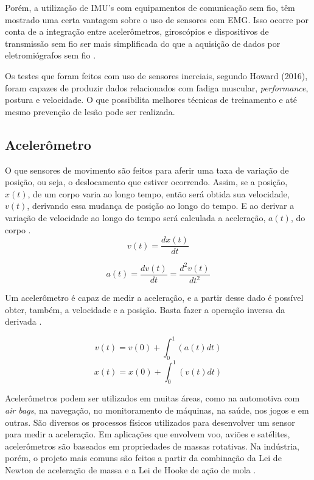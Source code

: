 		Porém, a utilização de IMU's com equipamentos de comunicação sem fio, têm mostrado uma certa vantagem sobre o uso de sensores com EMG. Isso ocorre por conta de a integração entre acelerômetros, giroscópios e dispositivos de transmissão sem fio ser mais simplificada do que a aquisição de dados por eletromiógrafos sem fio \cite{howard2016}. 
		
		Os testes que foram feitos com uso de sensores inerciais, segundo  Howard (2016), foram capazes de produzir dados relacionados com fadiga muscular, \textit{performance}, postura e velocidade. O que possibilita melhores técnicas de treinamento e até mesmo prevenção de lesão pode ser realizada.

			\subsection{Acelerômetro}
			
				O que sensores de movimento são feitos para aferir uma taxa de variação de posição, ou seja, o deslocamento que estiver ocorrendo. Assim, se a posição, $x(t)$, de um corpo varia ao longo tempo, então será obtida sua velocidade, $v(t)$,  derivando essa mudança de posição ao longo do tempo. E ao derivar a variação de velocidade ao longo do tempo será calculada a aceleração, $a(t)$, do corpo \cite{moyses2013}.
				\begin{equation}
				v(t) = \frac{dx(t)}{dt}
				\end{equation}
				
				\begin{equation}
				a(t) = \frac{dv(t)}{dt} = \frac{d^2v(t)}{dt^2} 
				\end{equation}
				
				Um acelerômetro é capaz de medir a aceleração, e a partir desse dado é possível obter, também, a velocidade e a posição. Basta fazer a operação inversa da derivada \cite{moyses2013}.
				
				\begin{equation}
				v(t) = v(0) + \int_{0}^{1}(a(t)dt)
				\end{equation}
				\begin{equation}
				x(t) = x(0) + \int_{0}^{1}(v(t)dt)
				\end{equation}
				
				Acelerômetros podem ser utilizados em muitas áreas, como na  automotiva com \textit{air bags}, na navegação, no monitoramento de máquinas, na saúde, nos jogos e em outras. São diversos os processos físicos utilizados para desenvolver um sensor para medir a aceleração. Em aplicações que envolvem voo, aviões e satélites,
				acelerômetros são baseados em propriedades de massas rotativas. Na indústria,
				porém, o projeto mais comuns são feitos a partir da combinação da Lei de Newton de
				aceleração de massa e a Lei de Hooke de ação de mola \cite{carneiro2003}.
				
